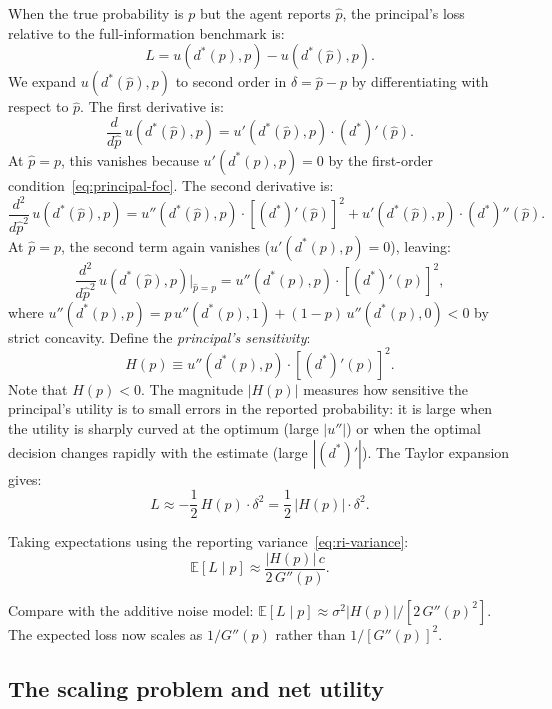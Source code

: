 \documentclass[11pt]{article}
\begin{document}
When the true probability is $p$ but the agent reports $\hat{p}$, the principal's loss relative to the full-information benchmark is:
\[
L = u(d^*(p),p) - u(d^*(\hat{p}),p).
\]
We expand $u(d^*(\hat{p}),p)$ to second order in $\delta = \hat{p} - p$ by differentiating with respect to $\hat{p}$. The first derivative is:
\[
\frac{d}{d\hat{p}}\,u(d^*(\hat{p}),p) = u'(d^*(\hat{p}),p)\cdot (d^*)'(\hat{p}).
\]
At $\hat{p} = p$, this vanishes because $u'(d^*(p),p) = 0$ by the first-order condition~\eqref{eq:principal-foc}. The second derivative is:
\[
\frac{d^2}{d\hat{p}^2}\,u(d^*(\hat{p}),p) = u''(d^*(\hat{p}),p)\cdot[(d^*)'(\hat{p})]^2 + u'(d^*(\hat{p}),p)\cdot(d^*)''(\hat{p}).
\]
At $\hat{p} = p$, the second term again vanishes ($u'(d^*(p),p)=0$), leaving:
\[
\frac{d^2}{d\hat{p}^2}\,u(d^*(\hat{p}),p)\bigg|_{\hat{p}=p} = u''(d^*(p),p)\cdot[(d^*)'(p)]^2,
\]
where $u''(d^*(p),p) = p\,u''(d^*(p),1) + (1-p)\,u''(d^*(p),0) < 0$ by strict concavity. Define the \emph{principal's sensitivity}:
\begin{equation}\label{eq:H-def}
H(p) \equiv u''(d^*(p),p)\cdot[(d^*)'(p)]^2.
\end{equation}
Note that $H(p) < 0$. The magnitude $|H(p)|$ measures how sensitive the principal's utility is to small errors in the reported probability: it is large when the utility is sharply curved at the optimum (large $|u''|$) or when the optimal decision changes rapidly with the estimate (large $|(d^*)'|$). The Taylor expansion gives:
\[
L \approx -\frac{1}{2}\,H(p)\cdot\delta^2 = \frac{1}{2}\,|H(p)|\cdot\delta^2.
\]

Taking expectations using the reporting variance~\eqref{eq:ri-variance}:
\begin{equation}\label{eq:ri-expected-loss}
\mathbb{E}[L \mid p] \approx \frac{|H(p)|\,c}{2\,G''(p)}.
\end{equation}

Compare with the additive noise model: $\mathbb{E}[L \mid p] \approx \sigma^2|H(p)|/[2\,G''(p)^2]$. The expected loss now scales as $1/G''(p)$ rather than $1/[G''(p)]^2$.

\subsection{The scaling problem and net utility}
\end{document}
